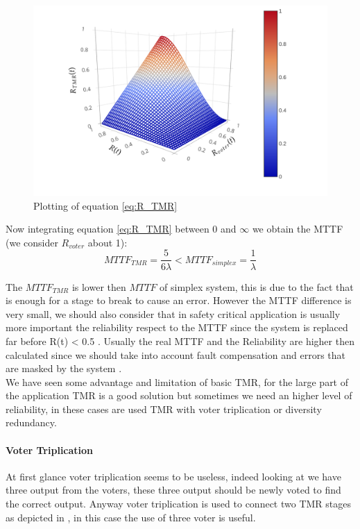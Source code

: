 {{{{    		    \begin{figure}[H]
        			\centering
        			\includegraphics[scale=0.15,center]{./images/TMR_reliability.png}
        			\caption{Plotting of equation \ref{eq:R_TMR}}
        			\label{fig:3Dplot_R_TMR}
        		\end{figure}
        		
        		Now integrating equation \ref{eq:R_TMR} between 0 and $\infty$ we obtain the MTTF  (we consider $R_{voter}$ about 1):
        		\begin{equation}
        		    MTTF_{TMR} = \frac{5}{6 \lambda} < MTTF_{simplex} = \frac{1}{\lambda}
        		\end{equation}
        		
        		The $MTTF_{TMR}$ is lower then $MTTF$ of simplex system, this is due to the fact that is enough for a stage to break to cause an error. However the MTTF difference is very small, we should also consider that in safety critical application is usually more important the reliability respect to the MTTF since the system is replaced far before R(t) < 0.5 .
        		Usually the real MTTF and the Reliability are higher then calculated since we should take into account fault compensation and errors that are masked by the system .\\
        		
        		We have seen some advantage and limitation of basic TMR, for the large part of the application TMR is a good solution but sometimes we need an higher level of reliability, in these cases are used TMR with voter triplication or diversity redundancy.
        		
        		\paragraph{Voter Triplication}{
        		    At first glance voter triplication seems to be useless, indeed looking at  we have three output from the voters, these three output should be newly voted to find the correct output. Anyway voter triplication is used to connect two TMR stages as depicted in , in this case the use of three voter is useful. 
        		    
}}}}}
